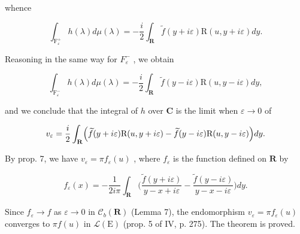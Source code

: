 whence

\[
\int_ {\mathrm{F} _ {\varepsilon} ^ {+}} h (\lambda) d \mu (\lambda) = - \frac {i}{2} \int_ {\mathbf {R}} \widetilde {f} (y + i \varepsilon) \mathrm{R} (u, y + i \varepsilon) d y.
\]

Reasoning in the same way for \(F_{\varepsilon}^{-}\) , we obtain

\[
\int_ {\mathrm{F} _ {\varepsilon} ^ {-}} h (\lambda) d \mu (\lambda) = - \frac {i}{2} \int_ {\mathbf {R}} \widetilde {f} (y - i \varepsilon) \mathrm{R} (u, y - i \varepsilon) d y,
\]

and we conclude that the integral of \(h\) over \(\mathbf{C}\) is the limit when \(\varepsilon\to0\) of

\[
v _ {\varepsilon} = \frac {i}{2} \int_ {\mathbf {R}} \Bigl (\widetilde {f} (y + i \varepsilon) \mathrm{R} (u, y + i \varepsilon) - \widetilde {f} (y - i \varepsilon) \mathrm{R} (u, y - i \varepsilon) \Bigr) d y.
\]

By prop. 7, we have \(v_{\varepsilon} = \pi f_{\varepsilon}(u)\) , where \(f_{\varepsilon}\) is the function defined on \(\mathbf{R}\) by

\[
f _ {\varepsilon} (x) = - \frac {1}{2 i \pi} \int_ {\mathbf {R}} \biggl (\frac {\widetilde {f} (y + i \varepsilon)}{y - x + i \varepsilon} - \frac {\widetilde {f} (y - i \varepsilon)}{y - x - i \varepsilon} \biggr) d y.
\]

Since \(f_{\varepsilon} \to f\) as \(\varepsilon \to 0\) in \(\mathcal{C}_{b}(\mathbf{R})\) (Lemma 7), the endomorphism \(v_{\varepsilon} = \pi f_{\varepsilon}(u)\) converges to \(\pi f(u)\) in \(\mathcal{L}(\mathrm{E})\) (prop. 5 of IV, p. 275). The theorem is proved.

